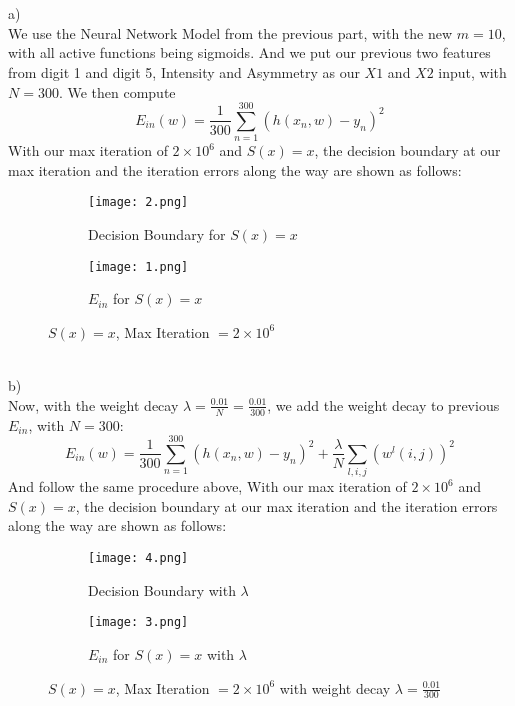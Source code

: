 \documentclass[12pt]{article}
\newcommand{\D}{\displaystyle}
\begin{document}
\newpage
{} \\\\
a)\\
\indent We use the Neural Network Model from the previous part, with the new $m=10$, with all active functions being sigmoids. And we put our previous two features from digit 1 and digit 5, Intensity and Asymmetry as our $X1$ and $X2$ input, with $N=300$. We then compute $$\D E_{in}(w) = \frac{1}{300}\sum^{300}_{n=1}(h(x_n,w)-y_n)^2$$ \indent With our max iteration of $2\times 10^{6}$ and $S(x) = x$, the decision boundary at  our max iteration and the iteration errors along the way are shown as follows:
\begin{figure}[H]
\centering
\begin{subfigure}{.5\textwidth}
  \centering
   \texttt{[image: 2.png]}
  \caption{Decision Boundary for $S(x) = x$}
  \label{fig:1}
\end{subfigure}%
\begin{subfigure}{.5\textwidth}
  \centering
   \texttt{[image: 1.png]}
  \caption{$E_{in}$ for $S(x) = x$}
  \label{fig:2}
\end{subfigure}
\caption{$S(x) = x$, Max Iteration $= 2\times 10^6$ }
\label{fig:test}
\end{figure}\indent\\
b)\\
\indent Now, with the weight decay $\D \lambda = \frac{0.01}{N} = \frac{0.01}{300}$, we add the weight decay to previous $E_{in}$, with $N=300$: $$\D E_{in}(w) = \frac{1}{300}\sum^{300}_{n=1}(h(x_n,w)-y_n)^2 + \frac{\lambda}{N}\sum_{l,i,j}(w^l(i,j))^2$$ \indent And follow the same procedure above, With our max iteration of $2\times 10^{6}$ and $S(x) = x$, the decision boundary at  our max iteration and the iteration errors along the way are shown as follows:
\begin{figure}[H]
\centering
\begin{subfigure}{.5\textwidth}
  \centering
   \texttt{[image: 4.png]}
  \caption{Decision Boundary with $\lambda$}
  \label{fig:1}
\end{subfigure}%
\begin{subfigure}{.5\textwidth}
  \centering
   \texttt{[image: 3.png]}
  \caption{$E_{in}$ for $S(x) = x$ with $\lambda$}
  \label{fig:2}
\end{subfigure}
\caption{$S(x) = x$, Max Iteration $= 2\times 10^6$ with weight decay $\lambda = \frac{0.01}{300}$}
\label{fig:test}
\end{figure}\indent\\
\end{document}
